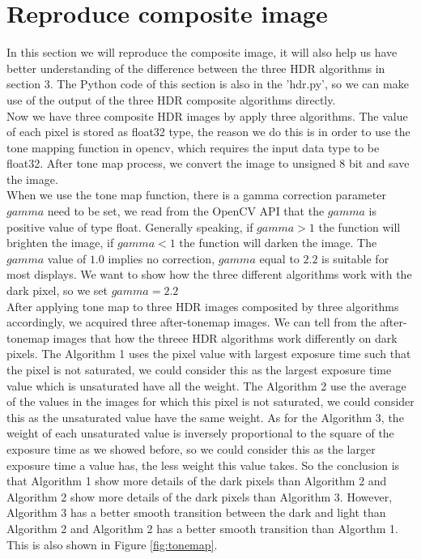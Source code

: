 \documentclass[10pt,twocolumn,letterpaper]{article}
\begin{document}
\section{Reproduce composite image}
\label{sec:reproduce}
In this section we will reproduce the composite image, it will also help us have better understanding of the difference between the three HDR algorithms in section 3. The Python code of this section is also in the 'hdr.py', so we can make use of the output of the three HDR composite algorithms directly. \\

Now we have three composite HDR images by apply three algorithms. The value of each pixel is stored as float32 type, the reason we do this is in order to use the tone mapping function in opencv, which requires the input data type to be float32.
After tone map process, we convert the image to unsigned 8 bit and save the image. \\

When we use the tone map function, there is a gamma correction parameter $gamma$ need to be set, we read from the OpenCV API that the $gamma$ is positive value of type float. Generally speaking, if $gamma > 1$ the function will brighten the image, if $gamma < 1$ the function will darken the image. The $gamma$ value of $1.0$ implies no correction, $gamma$ equal to $2.2$ is suitable for most displays. We want to show how the three different algorithms work with the dark pixel, so we set $gamma = 2.2$ \\

After applying tone map to three HDR images composited by three algorithms accordingly, we acquired three after-tonemap images. We can tell from the after-tonemap images that how the threee HDR algorithms work differently on dark pixels. The Algorithm 1 uses the pixel value with largest exposure time such that the pixel is not saturated, we could consider this as the largest exposure time value which is unsaturated have all the weight. The Algorithm 2 use the average of the values in the images for which this pixel is not saturated, we could consider this as the unsaturated value have the same weight. As for the Algorithm 3, the weight of each unsaturated value is inversely proportional to the square of the exposure time as we showed before, so we could consider this as the larger exposure time a value has, the less weight this value takes. So the conclusion is that Algorithm 1 show more details of the dark pixels than Algorithm 2 and Algorithm 2 show more details of the dark pixels than Algorithm 3. However, Algorithm 3 has a better smooth transition between the dark and light than Algorithm 2 and Algorithm 2 has a better smooth transition than Algorthm 1. This is also shown in Figure \ref{fig:tonemap}.
\end{document}
